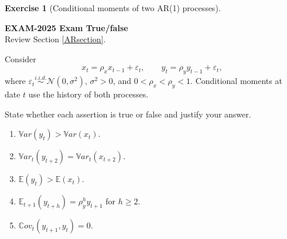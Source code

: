 \documentclass[
  11pt,
]{book}
\providecommand{\tightlist}{%
  \setlength{\itemsep}{0pt}\setlength{\parskip}{0pt}}
\theoremstyle{definition}
\theoremstyle{definition}
\theoremstyle{definition}
\newtheorem{exercise}{Exercise}[chapter]
\theoremstyle{definition}
\theoremstyle{remark}
\begin{document}
\begin{exercisebox}

\begin{exercise}[Conditional moments of two AR(1) processes]
\protect\hypertarget{exr:ex-exam2025-two-ar1-conditional-moments}{}\label{exr:ex-exam2025-two-ar1-conditional-moments}

\textbf{EXAM-2025 \textbar{} Exam \textbar{} True/false}\\
Review Section \ref{ARsection}.

Consider
\[
x_t=\rho_xx_{t-1}+\varepsilon_t,
\qquad
y_t=\rho_yy_{t-1}+\varepsilon_t,
\]
where \(\varepsilon_t\overset{i.i.d.}{\sim}\mathcal N(0,\sigma^2)\), \(\sigma^2>0\), and \(0<\rho_x<\rho_y<1\). Conditional moments at date \(t\) use the history of both processes.

State whether each assertion is true or false and justify your answer.

\begin{enumerate}
\def\labelenumi{\arabic{enumi}.}
\tightlist
\item
  \(\mathbb{V}ar(y_t)>\mathbb{V}ar(x_t)\).
\item
  \(\mathbb{V}ar_t(y_{t+2})=\mathbb{V}ar_t(x_{t+2})\).
\item
  \(\mathbb E(y_t)>\mathbb E(x_t)\).
\item
  \(\mathbb E_{t+1}(y_{t+h})=\rho_y^hy_{t+1}\) for \(h\ge2\).
\item
  \(\mathbb{C}ov_t(y_{t+1},y_t)=0\).
\end{enumerate}

\end{exercise}

\end{exercisebox}

\end{document}
